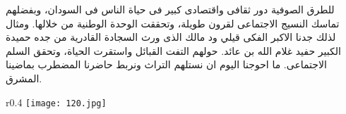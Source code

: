 \documentclass[12pt]{article}
\begin{document}
\vspace{.2cm}

\begin{arabtext}
{ \hspace{.1cm} للطرق الصوفية دور ثقافى واقتصادى كبير فى حياة الناس فى السودان، وبفضلهم تماسك النسيج الاجتماعى لقرون طويلة، وتحققت الوحدة الوطنية من خلالها. ومثال لذلك جدنا الاكبر الفكى قيلي ود مالك الذى ورث السجادة القادرية من جده حميدة الكبير حفيد غلام الله بن عائد. حولهم التفت القبائل واستقرت الحياة، وتحقق السلم الاجتماعى. ما احوجنا اليوم ان نستلهم التراث ونربط حاضرنا المضطرب بماضينا المشرق.}
\end{arabtext}
\begin{wrapfigure}{r}{0.4\textwidth}
\texttt{[image: 120.jpg]}
\end{wrapfigure}
\end{document}
